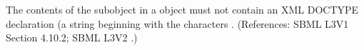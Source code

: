 The contents of the \Message subobject in a \Constraint object must not
contain an XML DOCTYPE declaration (\ie a string beginning with the
characters .  (References: SBML L3V1 Section 4.10.2; SBML L3V2
.)
